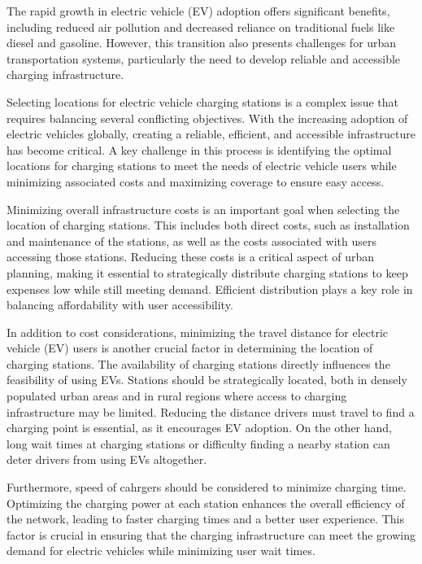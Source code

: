 The rapid growth in electric vehicle (EV) adoption offers significant benefits, including reduced air pollution and decreased reliance on traditional fuels like diesel and gasoline. However, this transition also presents challenges for urban transportation systems, particularly the need to develop reliable and accessible charging infrastructure.

Selecting locations for electric vehicle charging stations is a complex issue that requires balancing several conflicting objectives. With the increasing adoption of electric vehicles globally, creating a reliable, efficient, and accessible infrastructure has become critical. A key challenge in this process is identifying the optimal locations for charging stations to meet the needs of electric vehicle users while minimizing associated costs and maximizing coverage to ensure easy access.

Minimizing overall infrastructure costs is an important goal when selecting the location of charging stations. This includes both direct costs, such as installation and maintenance of the stations, as well as the costs associated with users accessing those stations. Reducing these costs is a critical aspect of urban planning, making it essential to strategically distribute charging stations to keep expenses low while still meeting demand. Efficient distribution plays a key role in balancing affordability with user accessibility.

In addition to cost considerations, minimizing the travel distance for electric vehicle (EV) users is another crucial factor in determining the location of charging stations. The availability of charging stations directly influences the feasibility of using EVs. Stations should be strategically located, both in densely populated urban areas and in rural regions where access to charging infrastructure may be limited. Reducing the distance drivers must travel to find a charging point is essential, as it encourages EV adoption. On the other hand, long wait times at charging stations or difficulty finding a nearby station can deter drivers from using EVs altogether.

Furthermore, speed of cahrgers should be considered to minimize charging time. Optimizing the charging power at each station enhances the overall efficiency of the network, leading to faster charging times and a better user experience. This factor is crucial in ensuring that the charging infrastructure can meet the growing demand for electric vehicles while minimizing user wait times.


